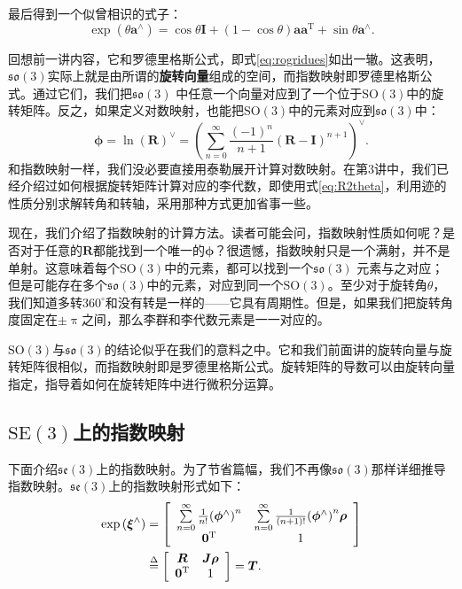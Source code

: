 最后得到一个似曾相识的式子：
\begin{equation}
\exp( \theta \bm{a}^\wedge ) = \cos \theta \bm{I} + (1 - \cos \theta )\bm{a}{\bm{a}^\mathrm{T}} + \sin \theta {\bm{a}^ \wedge }.
\end{equation}

回想前一讲内容，它和罗德里格斯公式，即式\eqref{eq:rogridues}如出一辙。这表明，$\mathfrak{so}(3)$实际上就是由所谓的\textbf{旋转向量}组成的空间，而指数映射即罗德里格斯公式。通过它们，我们把$\mathfrak{so}(3)$ 中任意一个向量对应到了一个位于$\mathrm{SO}(3)$中的旋转矩阵。反之，如果定义对数映射，也能把$\mathrm{SO}(3)$中的元素对应到$\mathfrak{so}(3)$中：
\begin{equation}
\boldsymbol{\phi}  = \ln {\left( \bm{R} \right)^ \vee } = {\left( {\sum\limits_{n = 0}^\infty  {\frac{{{{\left( { - 1} \right)}^n}}}{{n + 1}}{{\left( { \bm{R} - \bm{I}} \right)}^{n + 1}}} } \right)^ \vee }.
\end{equation}
和指数映射一样，我们没必要直接用泰勒展开计算对数映射。在第3讲中，我们已经介绍过如何根据旋转矩阵计算对应的李代数，即使用式\eqref{eq:R2theta}，利用迹的性质分别求解转角和转轴，采用那种方式更加省事一些。

现在，我们介绍了指数映射的计算方法。读者可能会问，指数映射性质如何呢？是否对于任意的$\bm{R}$都能找到一个唯一的$\boldsymbol{\phi}$？很遗憾，指数映射只是一个满射，并不是单射。这意味着每个$\mathrm{SO}(3)$中的元素，都可以找到一个$\mathfrak{so}(3)$ 元素与之对应；但是可能存在多个$\mathfrak{so}(3)$中的元素，对应到同一个$\mathrm{SO}(3)$。至少对于旋转角$\theta$，我们知道多转$360^\circ$和没有转是一样的——它具有周期性。但是，如果我们把旋转角度固定在$\pm \uppi$之间，那么李群和李代数元素是一一对应的。

$\mathrm{SO}(3)$与$\mathfrak{so}(3)$的结论似乎在我们的意料之中。它和我们前面讲的旋转向量与旋转矩阵很相似，而指数映射即是罗德里格斯公式。旋转矩阵的导数可以由旋转向量指定，指导着如何在旋转矩阵中进行微积分运算。

\subsection{$\mathrm{SE}(3)$上的指数映射}

下面介绍$\mathfrak{se}(3)$上的指数映射。为了节省篇幅，我们不再像$\mathfrak{so}(3)$那样详细推导指数映射。$\mathfrak{se}(3)$上的指数映射形式如下：
\begin{align}
\exp \left( {{ \boldsymbol{\xi} ^ \wedge }} \right) &= \left[ {\begin{array}{*{20}{c}}
	{\sum\limits_{n = 0}^\infty  {\frac{1}{{n!}}{{\left( {{\boldsymbol{\phi} ^ \wedge }} \right)}^n}} }&{\sum\limits_{n = 0}^\infty  {\frac{1}{{\left( {n + 1} \right)!}}{{\left( {{\boldsymbol{\phi} ^ \wedge }} \right)}^n} \boldsymbol{\rho} } }\\
	{{\bm{0}^\mathrm{T}}}&1
	\end{array}} \right] \\
&\buildrel \Delta \over =  \left[ {\begin{array}{*{20}{c}}
	\bm{R} &{\bm{J\rho} } \\
	{{\bm{0}^\mathrm{T}}}&1
	\end{array}} \right] = \bm{T}.
\end{align}

